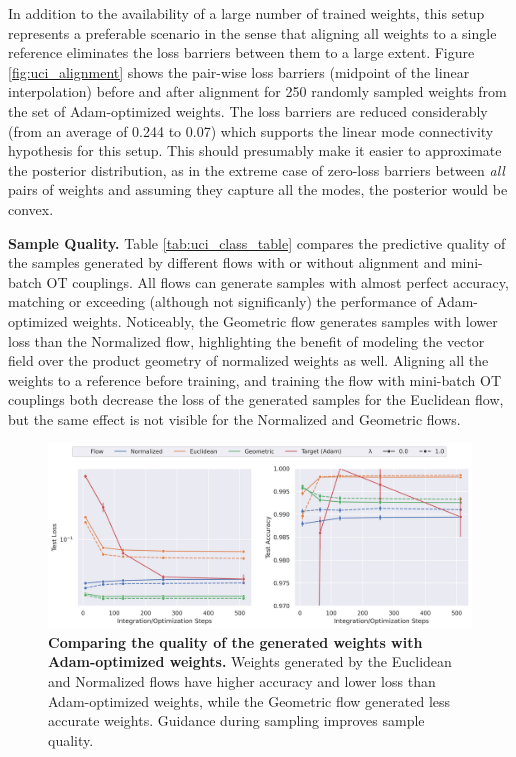 In addition to the availability of a large number of trained weights, this setup represents a preferable scenario in the sense that aligning all weights to a single reference eliminates the loss barriers between them to a large extent. Figure \ref{fig:uci_alignment} shows the pair-wise loss barriers (midpoint of the linear interpolation) before and after alignment for 250 randomly sampled weights from the set of Adam-optimized weights. The loss barriers are reduced considerably (from an average of 0.244 to 0.07) which supports the linear mode connectivity hypothesis for this setup. This should presumably make it easier to approximate the posterior distribution, as in the extreme case of zero-loss barriers between \textit{all} pairs of weights and assuming they capture all the modes, the posterior would be convex. 

\textbf{Sample Quality.} Table \ref{tab:uci_class_table} compares the predictive quality of the samples generated by different flows with or without alignment and mini-batch OT couplings. All flows can generate samples with almost perfect accuracy, matching or exceeding (although not significanly) the performance of Adam-optimized weights. Noticeably, the Geometric flow generates samples with lower loss than the Normalized flow, highlighting the benefit of modeling the vector field over the product geometry of normalized weights as well. Aligning all the weights to a reference before training, and training the flow with mini-batch OT couplings both decrease the loss of the generated samples for the Euclidean flow, but the same effect is not visible for the Normalized and Geometric flows. 

\begin{figure}[t!]
    \centering
    \includegraphics[width=\linewidth]{figures/uci_17/uci_17_steps_both.png}
    \caption{\label{fig:uci_steps}\textbf{Comparing the quality of the generated weights with Adam-optimized weights.} Weights generated by the Euclidean and Normalized flows have higher accuracy and lower loss than Adam-optimized weights, while the Geometric flow generated less accurate weights. Guidance during sampling improves sample quality.} 
\end{figure}


